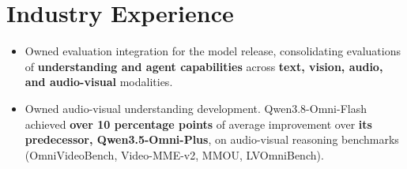 \documentclass{resume}
\begin{document}




\section{Industry Experience}

\par\vspace{0.8em}
\par
\begin{itemize}
  \raggedright
  \item Owned evaluation integration for the model release, consolidating evaluations of \textbf{understanding and agent capabilities} across \textbf{text, vision, audio, and audio-visual} modalities.
  \item Owned audio-visual understanding development. Qwen3.8-Omni-Flash achieved \textbf{over 10 percentage points} of average improvement over \textbf{its predecessor, Qwen3.5-Omni-Plus}, on audio-visual reasoning benchmarks (OmniVideoBench, \mbox{Video-MME-v2}, MMOU, LVOmniBench).
\end{itemize}
\end{document}
